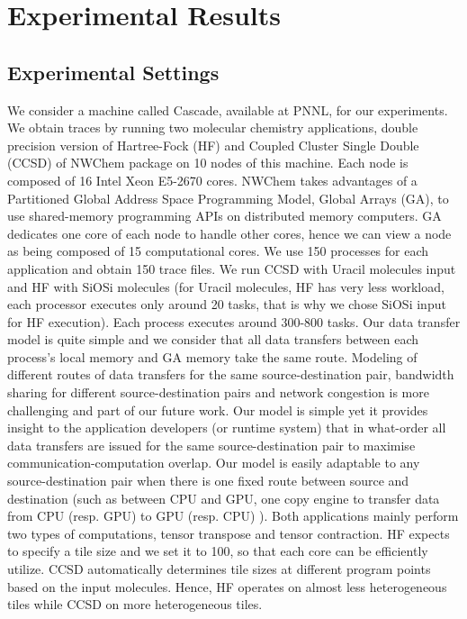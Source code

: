 \documentclass[sigconf]{acmart}
\begin{document}
{		
		\section{Experimental Results}
		\label{sec:exp}
		
		\subsection{Experimental Settings}
		
		We consider a machine called Cascade, available at PNNL, for our experiments. We obtain traces by running two molecular chemistry applications, double precision version of Hartree-Fock (HF) and Coupled Cluster Single Double (CCSD) of NWChem package on 10 nodes of this machine. Each node is composed of 16 Intel Xeon E5-2670 cores. NWChem takes advantages of a Partitioned Global Address Space Programming Model, Global Arrays (GA), to use shared-memory programming APIs on distributed memory computers. GA dedicates one core of each node to handle other cores, hence we can view a node as being composed of 15 computational cores. We use 150 processes for each application and obtain 150 trace files. We run CCSD with Uracil molecules input and HF with SiOSi molecules (for Uracil molecules, HF has very less workload, each processor executes only around 20 tasks, that is why we chose SiOSi input for HF execution). Each process executes around 300-800 tasks. Our data transfer model is quite simple and we consider that all data transfers between each process's local memory and GA memory take the same route. Modeling of different routes of data transfers for the same source-destination pair, bandwidth sharing for different source-destination pairs and network congestion is more challenging and part of our future work. Our model is simple yet it provides insight to the application developers (or runtime system) that in what-order all data transfers are issued for the same source-destination pair to maximise communication-computation overlap. Our model is easily adaptable to any source-destination pair when there is one fixed route between source and destination (such as between CPU and GPU, one copy engine to transfer data from CPU (resp. GPU) to GPU (resp. CPU) ).
		Both applications mainly perform two types of computations, tensor transpose and tensor contraction. HF expects to specify a tile size and we set it to 100, so that each core can be efficiently utilize. CCSD automatically determines tile sizes at different program points based on the input molecules. Hence, HF operates on almost less heterogeneous tiles while CCSD on more heterogeneous tiles.
		
}
\end{document}
